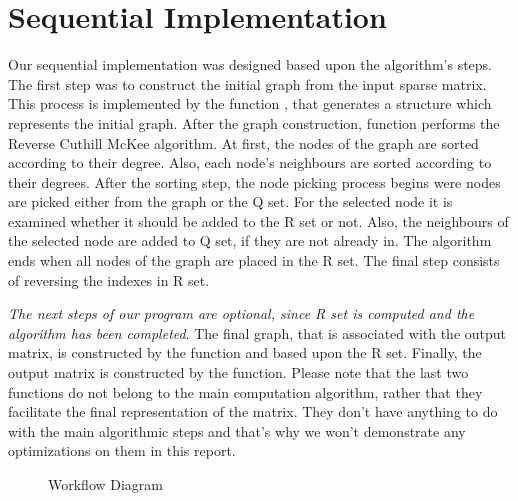 \section{Sequential Implementation}
Our sequential implementation was designed based upon the algorithm's steps. The first step was to construct the initial graph from the input sparse matrix. This process is  implemented by the function , that generates a  structure which represents the initial graph. After the graph construction,  function performs the Reverse Cuthill McKee algorithm. At first, the nodes of the graph are sorted according to their degree. Also, each node's neighbours are sorted according to their degrees. After the sorting step, the node picking process begins were nodes are picked either from the graph or the Q set. For the selected node it is examined whether it should be added to the R set or not. Also, the neighbours of the selected node are added to Q set, if they are not already in. The algorithm ends when all nodes of the graph are placed in the R set. The final step consists of reversing the indexes in R set.

\emph{The next steps of our program are optional, since R set is computed and the algorithm has been completed}. The final graph, that is associated with the output matrix, is constructed by the function  and based upon the R set. Finally, the output matrix is constructed by the  function. Please note that the last two functions  do not belong to the main computation algorithm, rather that they facilitate the final representation of the matrix. They don't have anything to do with the main algorithmic steps and that's why we won't demonstrate any optimizations on them in this report.
\begin{figure}[H]
  \centering
  
  \caption{Workflow Diagram}
  \label{fig:d1}
\end{figure}

